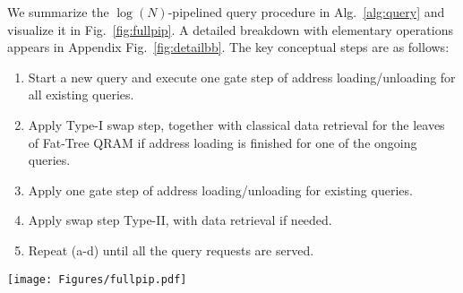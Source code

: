We summarize the $\log(N)$-pipelined query procedure in Alg.~\ref{alg:query} and visualize it in Fig.~\ref{fig:fullpip}. A detailed breakdown with elementary operations appears in Appendix Fig.~\ref{fig:detailbb}. The key conceptual steps are as follows:


\begin{enumerate}[label= (\alph*)]
    \item Start a new query and execute one gate step of address loading/unloading for all existing queries.
    \item Apply Type-I swap step, together with classical data retrieval for the leaves of Fat-Tree QRAM if address loading is finished for one of the ongoing queries.
    \item Apply one gate step of address loading/unloading for existing queries. 
    \item Apply swap step Type-II, with data retrieval if needed.
    \item Repeat (a-d) until all the query requests are served.
\end{enumerate}

\begin{figure*}[t]
         \centering
         \texttt{[image: Figures/fullpip.pdf]}
         \caption{Pipeline schedule of a capacity-8 Fat-Tree QRAM running 3 concurrent queries. Colors indicate which conceptual QRAM $k$ in Fig.~\ref{fig:small} is being used at the hardware level. No conflicting colors in the same layer ensures no concurrent access to the same quantum routers. The latency overhead for each single query of Fat-Tree QRAM compared to the original BB QRAM (query latency 29:25 in the case $n=3$) comes from additional swap steps except the one coinciding with data retrieval, as it is included in BB QRAM's latency.}
         \label{fig:fullpip}
\end{figure*}



